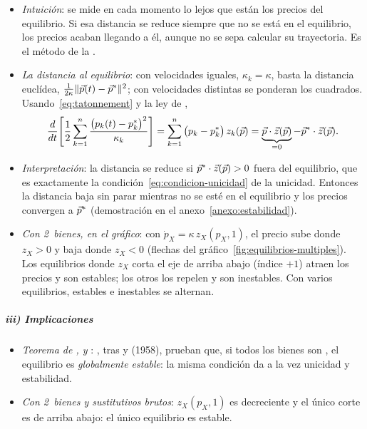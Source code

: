 \documentclass[11pt]{article}
\begin{document}
\begin{itemize}
\item \emph{Intuición}: se mide en cada momento lo lejos que están los precios del equilibrio. Si esa distancia se reduce siempre que no se está en el equilibrio, los precios acaban llegando a él, aunque no se sepa calcular su trayectoria. Es el método de la .
\item \emph{La distancia al equilibrio}: con velocidades iguales, $\kappa_k=\kappa$, basta la distancia euclídea, $\tfrac{1}{2\kappa}\lVert\vec{p}(t)-\vec{p}^*\rVert^2$; con velocidades distintas se ponderan los cuadrados. Usando~\eqref{eq:tatonnement} y la ley de ,
  \begin{equation}
  \frac{d}{dt}\Bigg[\frac12\sum_{k=1}^{n}\frac{\big(p_k(t)-p^*_k\big)^2}{\kappa_k}\Bigg]=\sum_{k=1}^{n}\big(p_k-p^*_k\big)\,z_k(\vec{p})=\underbrace{\vec{p}\cdot\vec{z}(\vec{p})}_{=0}-\vec{p}^*\cdot\vec{z}(\vec{p}). \label{eq:distancia}
  \end{equation}
\item \emph{Interpretación}: la distancia se reduce si $\vec{p}^*\cdot\vec{z}(\vec{p})>0$ fuera del equilibrio, que es exactamente la condición~\eqref{eq:condicion-unicidad} de la unicidad. Entonces la distancia baja sin parar mientras no se esté en el equilibrio y los precios convergen a $\vec{p}^*$ (demostración en el anexo~\ref{anexo:estabilidad}).
\item \emph{Con 2~bienes, en el gráfico}: con $\dot p_X=\kappa\,z_X(p_X,1)$, el precio sube donde $z_X>0$ y baja donde $z_X<0$ (flechas del gráfico~\ref{fig:equilibrios-multiples}). Los equilibrios donde $z_X$ corta el eje de arriba abajo (índice $+1$) atraen los precios y son estables; los otros los repelen y son inestables. Con varios equilibrios, estables e inestables se alternan.
\end{itemize}

\subparagraph{iii) Implicaciones}

\begin{itemize}
\item \emph{Teorema de ,  y }: \textcite{ArrowBlockHurwicz1959Stability}, tras  y  (1958), prueban que, si todos los bienes son , el equilibrio es \emph{globalmente estable}: la misma condición da a la vez unicidad y estabilidad.
\item \emph{Con 2~bienes y sustitutivos brutos}: $z_X(p_X,1)$ es decreciente y el único corte es de arriba abajo: el único equilibrio es estable.
\end{itemize}
\end{document}

